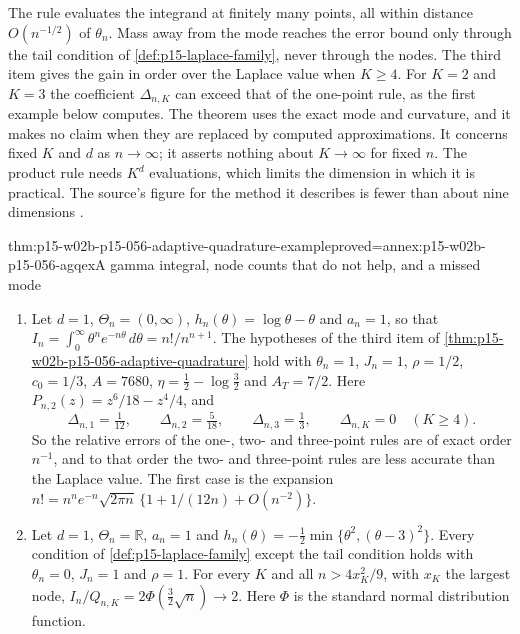 The rule evaluates the integrand at finitely many points, all within
distance \(O(n^{-1/2})\) of \(\theta_n\). Mass away from the mode reaches
the error bound only through the tail condition of
\cref{def:p15-laplace-family}, never through the nodes. The third item
gives the gain in order over the Laplace value when \(K\geq4\). For
\(K=2\) and \(K=3\) the coefficient \(\Delta_{n,K}\) can exceed that of the
one-point rule, as the first example below computes. The theorem uses the
exact mode and curvature, and it makes no claim when they are replaced by
computed approximations. It concerns fixed \(K\) and \(d\) as
\(n\to\infty\); it asserts nothing about \(K\to\infty\) for fixed \(n\).
The product rule needs \(K^d\) evaluations, which limits the dimension in
which it is practical. The source's figure for the method it describes is
fewer than about nine dimensions
\cite[Sec.~4.2, p.~779]{KassRaftery1995BayesFactors}.

\begin{hbtheorem}{thm:p15-w02b-p15-056-adaptive-quadrature-example}{proved=annex:p15-w02b-p15-056-agqex}{A gamma integral, node counts that do not help, and a missed mode}
\begin{enumerate}
\item Let \(d=1\), \(\Theta_n=(0,\infty)\),
\(h_n(\theta)=\log\theta-\theta\) and \(a_n=1\), so that
\(I_n=\int_0^\infty\theta^ne^{-n\theta}\,d\theta=n!/n^{n+1}\). The
hypotheses of the third item of
\cref{thm:p15-w02b-p15-056-adaptive-quadrature} hold with
\(\theta_n=1\), \(J_n=1\), \(\rho=1/2\), \(c_0=1/3\), \(A=7680\),
\(\eta=\tfrac12-\log\tfrac32\) and \(A_T=7/2\). Here
\(P_{n,2}(z)=z^6/18-z^4/4\), and
\[
 \Delta_{n,1}=\tfrac1{12},\qquad\Delta_{n,2}=\tfrac5{18},\qquad
 \Delta_{n,3}=\tfrac13,\qquad\Delta_{n,K}=0\quad(K\geq4).
\]
So the relative errors of the one-, two- and three-point rules are of
exact order \(n^{-1}\), and to that order the two- and three-point rules
are less accurate than the Laplace value. The first case is the expansion
\(n!=n^ne^{-n}\sqrt{2\pi n}\,\{1+1/(12n)+O(n^{-2})\}\).
\item Let \(d=1\), \(\Theta_n=\mathbb R\), \(a_n=1\) and
\(h_n(\theta)=-\tfrac12\min\{\theta^2,(\theta-3)^2\}\). Every condition of
\cref{def:p15-laplace-family} except the tail condition holds with
\(\theta_n=0\), \(J_n=1\) and \(\rho=1\). For every \(K\) and all
\(n>4x_K^2/9\), with \(x_K\) the largest node,
\(I_n/Q_{n,K}=2\Phi(\tfrac32\sqrt n)\to2\). Here \(\Phi\) is the standard
normal distribution function.
\end{enumerate}
\end{hbtheorem}


